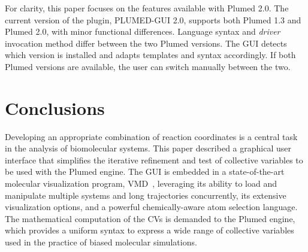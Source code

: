 \documentclass[preprint,12pt]{elsarticle}
\begin{document}
For clarity, this paper focuses on the features available with Plumed
2.0. The current version of the plugin, PLUMED-GUI 2.0, supports both
Plumed 1.3 and Plumed 2.0, with minor functional differences.
Language syntax and \emph{driver} invocation method differ between the
two Plumed versions.  The GUI detects which version is installed and
adapts templates and syntax accordingly.  If both Plumed versions are
available, the user can switch manually between the two.

















\section{Conclusions}

Developing an appropriate combination of reaction coordinates is a
central task in the analysis of biomolecular systems.  This paper
described a graphical user interface that simplifies the iterative
refinement and test of collective variables to be used with the Plumed
engine. The GUI is embedded in a state-of-the-art molecular
visualization program, VMD~\cite{Humphrey_Dalke_Schulten_1996},
leveraging its ability to load and manipulate multiple systems and
long trajectories concurrently, its extensive visualization options,
and a powerful chemically-aware atom selection language. The
mathematical computation of the CVs is demanded to the Plumed engine,
which provides a uniform syntax to express a wide range of collective
variables used in the practice of biased molecular simulations.
\end{document}
